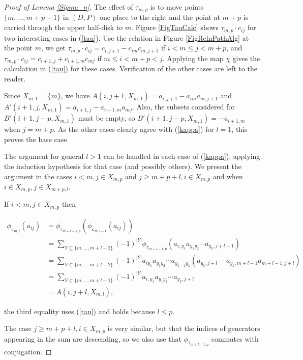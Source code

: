 \documentclass[11pt]{amsart}
\def\t{{\tau}}
\def\k{{\kappa}}
\theoremstyle{definition}
\begin{document}
\begin{proof} [Proof of Lemma \ref{Sigma_n}]
The effect of $\tau_{m,p}$ is to move points $\{m,\ldots,m+p-1\}$ in $(D,P)$ one place to the right and the point at $m+p$ is carried through the upper half-disk to $m$. Figure \ref{FigTauCalc} shows $\t_{m,p}\cdot c_{ij}$ for two interesting cases in (\ref{tau}). Use the relation in Figure \ref{FigRelnPathAlg} at the point $m$, we get $\t_{m,p}\cdot c_{ij} = c_{i,j+1}-c_{im}c_{m,j+1}$ if $i<m\le j<m+p$, and $\t_{m,p}\cdot c_{ij} = c_{i+1,j}+c_{i+1,m}c_{mj}$ if $m\le i<m+p<j$. Applying the map $\chi$ gives the calculation in (\ref{tau}) for these cases. Verification of the other cases are left to the reader.

Since $X_{m,1}=\{m\}$, we have $A(i,j+1,X_{m,1})=a_{i,j+1}-a_{im}a_{m,j+1}$ and $A'(i+1,j,X_{m,1})=a_{i+1,j}-a_{i+1,m}a_{mj}$. Also, the subsets considered for $B'(i+1,j-p,X_{m,1})$ must be empty, so $B'(i+1,j-p,X_{m,1})=-a_{i+1,m}$ when $j=m+p$. As the other cases clearly agree with (\ref{kappa}) for $l=1$, this proves the base case.

The argument for general $l>1$ can be handled in each case of (\ref{kappa}), applying the induction hypothesis for that case (and possibly others).  We present the argument in the cases $i<m,j\in X_{m,p}$ and $j\ge m+p+l,i\in X_{m,p}$ and when $i\in X_{m,p}, j\in X_{m+p,l}$.

If $i<m, j\in X_{m,p}$ then

\begin{align*}
\phi_{\k_{m,l}}(a_{ij}) &= \phi_{\t_{m+l-1,p}}(\phi_{\k_{m,l-1}}(a_{ij}))\\
&= \sum_{{\scriptscriptstyle Y\subseteq \{m,\ldots,m+l-2\}}} (-1)^{|Y|} \phi_{\t_{m+l-1,p}}(a_{i,y_1}a_{y_1y_2}\cdots a_{y_k,j+l-1})\\
&= \sum_{{\scriptscriptstyle Y\subseteq \{m,\ldots,m+l-2\}}} (-1)^{|Y|} a_{iy_1}a_{y_1y_2}\cdots a_{y_{k-1}y_k}(a_{y_k,j+l}-a_{y_k,m+l-1}a_{m+l-1,j+l})\\
&= \sum_{{\scriptscriptstyle Y\subseteq \{m,\ldots,m+l-1\}}} (-1)^{|Y|} a_{i,y_1}a_{y_1y_2}\cdots a_{y_k,j+l}\\
&= A(i,j+l,X_{m,l}),
\end{align*}

the third equality uses (\ref{tau}) and holds because $l\le p$. 

The case $j\ge m+p+l,i\in X_{m,p}$ is very similar, but that the indices of generators appearing in the sum are descending, so we also use that $\phi_{\t_{m+l-1,p}}$ commutes with conjugation.


\end{proof}
\end{document}
